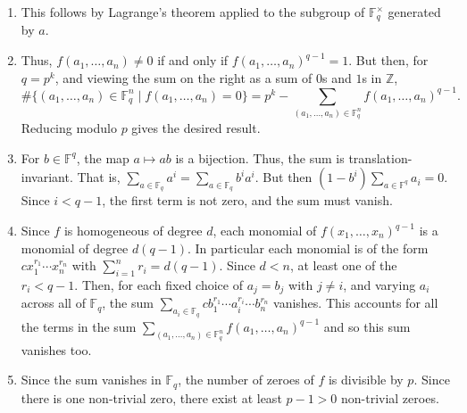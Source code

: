 \documentclass[12 pt, letterpaper]{hmcpset}
\begin{document}
\begin{solution}
	\begin{enumerate}
		\item This follows by Lagrange's theorem applied to the subgroup of $\mathbb{F}_{q}^{\times}$ generated by $a$.

		\item Thus, $f(a_{1}, \dots, a_{n}) \neq 0$ if and only if  $f(a_{1}, \dots, a_{n})^{q - 1} = 1$. But then, for $q = p^{k}$, and viewing the sum on the right as a sum of $0$s and $1$s in $\mathbb{Z}$,
			\[
				\# \{ (a_{1}, \dots, a_{n}) \in \mathbb{F}_{q}^{n} \mid f(a_{1}, \dots, a_{n}) = 0 \} = p^{k} - \sum_{(a_{1}, \dots, a_{n}) \in \mathbb{F}_{q}^{n}} f(a_{1}, \dots, a_{n})^{q - 1}.
			\]
			Reducing modulo $p$ gives the desired result.

		\item For $b \in \mathbb{F}^{q}$, the map $a \mapsto ab$ is a bijection. Thus, the sum is translation-invariant. That is, $\sum_{a \in \mathbb{F}_{q}} a^{i} = \sum_{a \in \mathbb{F}_{q}} b^{i} a^{i}$. But then $(1 - b^{i}) \sum_{a \in \mathbb{F}^{q}} a_{i} = 0$. Since $i < q - 1$, the first term is not zero, and the sum must vanish.

		\item Since $f$ is homogeneous of degree $d$, each monomial of $f(x_{1}, \dots, x_{n})^{q - 1}$ is a monomial of degree $d(q - 1)$. In particular each monomial is of the form  $c x_{1}^{r_{1}} \cdots x_{n}^{r_{n}}$ with $\sum_{i = 1}^{n} r_{i} = d (q - 1)$. Since $d < n$, at least one of the $r_{i} < q - 1$. Then, for each fixed choice of $a_{j} = b_{j}$ with $j \neq i$, and varying $a_{i}$ across all of $\mathbb{F}_{q}$, the sum $\sum_{a_{i} \in \mathbb{F}_{q}} c b_{1}^{r_{1}} \cdots a_{i}^{r_{i}} \cdots b_{n}^{r_{n}}$ vanishes. This accounts for all the terms in the sum $\sum_{(a_{1}, \dots, a_{n}) \in \mathbb{F}_{q}^{n}} f(a_{1}, \dots, a_{n})^{q - 1}$ and so this sum vanishes too.

		\item Since the sum vanishes in $\mathbb{F}_{q}$, the number of zeroes of $f$ is divisible by $p$. Since there is one non-trivial zero, there exist at least $p - 1 > 0$ non-trivial zeroes.
	\end{enumerate}
\end{solution}

\pagebreak
\end{document}
